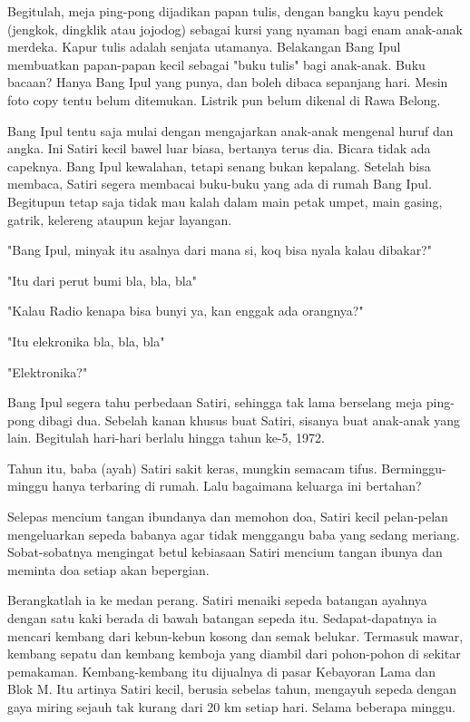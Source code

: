 Begitulah, meja ping-pong dijadikan papan tulis, dengan bangku kayu pendek (jengkok, dingklik atau jojodog) sebagai kursi yang nyaman bagi enam anak-anak merdeka. Kapur tulis adalah senjata utamanya. Belakangan Bang Ipul membuatkan papan-papan kecil sebagai "buku tulis" bagi anak-anak. Buku bacaan? Hanya Bang Ipul yang punya, dan boleh dibaca sepanjang hari. Mesin foto copy tentu belum ditemukan. Listrik pun belum dikenal di Rawa Belong.

Bang Ipul tentu saja mulai dengan mengajarkan anak-anak mengenal huruf dan angka. Ini Satiri kecil bawel luar biasa, bertanya terus dia. Bicara tidak ada capeknya. Bang Ipul kewalahan, tetapi senang bukan kepalang. Setelah bisa membaca, Satiri segera membacai buku-buku yang ada di rumah Bang Ipul. Begitupun tetap saja tidak mau kalah dalam main petak umpet, main gasing, gatrik, kelereng ataupun kejar layangan.

"Bang Ipul, minyak itu asalnya dari mana si, koq bisa nyala kalau dibakar?"

"Itu dari perut bumi bla, bla, bla"

"Kalau Radio kenapa bisa bunyi ya, kan enggak ada orangnya?"

"Itu elekronika bla, bla, bla"

"Elektronika?"

Bang Ipul segera tahu perbedaan Satiri, sehingga tak lama berselang meja ping-pong dibagi dua. Sebelah kanan khusus buat Satiri, sisanya buat anak-anak yang lain. Begitulah hari-hari berlalu hingga tahun ke-5, 1972.

Tahun itu, baba (ayah) Satiri sakit keras, mungkin semacam tifus. Berminggu-minggu hanya terbaring di rumah. Lalu bagaimana keluarga ini bertahan?

Selepas mencium tangan ibundanya dan memohon doa, Satiri kecil pelan-pelan mengeluarkan sepeda babanya agar tidak menggangu baba yang sedang meriang. Sobat-sobatnya mengingat betul kebiasaan Satiri mencium tangan ibunya dan meminta doa setiap akan bepergian.

Berangkatlah ia ke medan perang. Satiri menaiki sepeda batangan ayahnya dengan satu kaki berada di bawah batangan sepeda itu. Sedapat-dapatnya ia mencari kembang dari kebun-kebun kosong dan semak belukar. Termasuk mawar, kembang sepatu dan kembang kemboja yang diambil dari pohon-pohon di sekitar pemakaman. Kembang-kembang itu dijualnya di pasar Kebayoran Lama dan Blok M. Itu artinya Satiri kecil, berusia sebelas tahun, mengayuh sepeda dengan gaya miring sejauh tak kurang dari 20 km setiap hari. Selama beberapa minggu.

